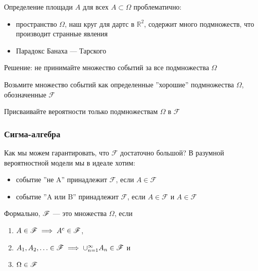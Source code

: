 \begin{frame}

    \vspace{2em}
    Определение площади $A$ для всех $A\subset \Omega$ проблематично:
    
    \begin{itemize}
        \item пространство $\Omega$, наш круг для дартс в $\mathbb{R}^{2}$, 
        содержит много подмножеств, что производит странные явления
        \item Парадокс Банаха — Тарского 
    \end{itemize}

    Решение: не принимайте множество событий за все подмножества $\Omega$
    
    Возьмите множество событий как определенные ''хорошие'' подмножества $\Omega$, 
    обозначенные $\mathscr{F}$

    Присваивайте вероятности только подмножествам $\Omega$ в $\mathscr{F}$

\end{frame}

\begin{frame}\frametitle{Сигма-алгебра}

    \vspace{2em}
    Как мы можем гарантировать, что $\mathscr{F}$ достаточно большой? 
    В разумной вероятностной модели мы в идеале хотим:
    \begin{itemize}
        \item  событие ''не A'' принадлежит $\mathscr{F}$, если $A\in \mathscr{F}$
        \item  событие ''A или B'' принадлежит $\mathscr{F}$, если $A\in \mathscr{F}$ 
                и $A\in \mathscr{F}$
    \end{itemize}
    
    \vspace{1em}
    Формально, $\mathscr F$ --- это
     множества $\Omega$, если
    \begin{enumerate}
        \item $A \in \mathscr F \implies A^c \in \mathscr F$,
        \item $A_1, A_2, \ldots \in \mathscr F \implies \cup_{n=1}^{\infty} A_n \in \mathscr F$
            и
        \item $\Omega \in \mathscr F$
    \end{enumerate}
    
\end{frame}

